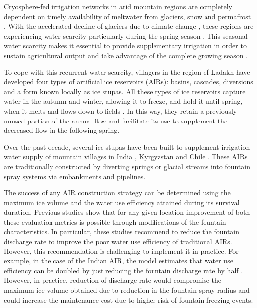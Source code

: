 \documentclass[tc, manuscript]{copernicus}
\begin{document}
\introduction

Cryosphere-fed irrigation networks in arid mountain regions are completely dependent on timely availability of
meltwater from glaciers, snow and permafrost \citep{farhanHydrologicalRegimesConjunction2015}. With the
accelerated decline of glaciers due to climate change \citep{nusserLocalKnowledgeGlobal2016}, these regions are
experiencing water scarcity particularly during the spring season \citep{norphelSnowWaterHarvesting2015}. This
seasonal water scarcity makes it essential to provide supplementary irrigation in order to sustain agricultural
output and take advantage of the complete growing season \citep{nusserLocalKnowledgeGlobal2016,
vincentEnergyClimateChange2009}.

To cope with this recurrent water scarcity, villagers in the region of Ladakh have developed four types of
artificial ice reservoirs (AIRs): basins, cascades, diversions and a form known locally as ice stupas. All these
types of ice reservoirs capture water in the autumn and winter, allowing it to freeze, and hold it until spring,
when it melts and flows down to fields \citep{vinceGlacierMan2009, clouseLadakhArtificialGlaciers2017,
nusserSociohydrologyArtificialGlaciers2019, ipccChapterHighMountain2019}. In this way, they retain a previously
unused portion of the annual flow and facilitate its use to supplement the decreased flow in the following
spring. 

Over the past decade, several ice stupas have been built to supplement irrigation water supply of mountain
villages in India \citep{wangchukIceStupaCompetition2020, palmerStoringFrozenWater2022,
aggarwalAdaptationClimateChange2021}, Kyrgyzstan \citep{bbcnewsBrightArtificialGlacier2020} and Chile
\citep{reutersConservationistsChileAim2021}. These AIRs are traditionally constructed by diverting springs or
glacial streams into fountain spray systems via embankments and pipelines. 

The success of any AIR construction strategy can be determined using the maximum ice volume and the water use
efficiency attained during its survival duration. Previous studies
\citep{balasubramanianInfluenceMeteorologicalConditions2022} show that for any given location improvement of
both these evaluation metrics is possible through modifications of the fountain characteristics. In particular,
these studies recommend to reduce the fountain discharge rate to improve the poor water use efficiency of
traditional AIRs. However, this recommendation is challenging to implement it in practice. For example, in the
case of the Indian AIR, the model estimates that water use efficiency can be doubled by just reducing the
fountain discharge rate by half \citep{balasubramanianInfluenceMeteorologicalConditions2022}. However, in
practice, reduction of discharge rate would compromise the maximum ice volume obtained due to reduction in the
fountain spray radius and could increase the maintenance cost due to higher risk of fountain freezing events.  
\end{document}
